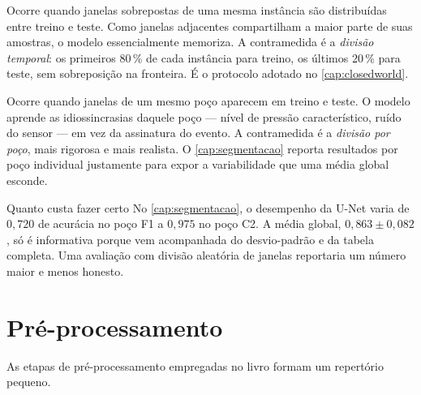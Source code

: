 \begin{description}[leftmargin=0pt,style=nextline,itemsep=0.4em]

\item[Vazamento temporal.] Ocorre quando janelas sobrepostas de uma mesma instância
são distribuídas entre treino e teste. Como janelas adjacentes compartilham a maior
parte de suas amostras, o modelo essencialmente memoriza. A contramedida é a
\emph{divisão temporal}: os primeiros 80\,\% de cada instância para treino, os últimos
20\,\% para teste, sem sobreposição na fronteira. É o protocolo adotado no
\cref{cap:closedworld}.

\item[Vazamento entre poços.] Ocorre quando janelas de um mesmo poço aparecem em treino
e teste. O modelo aprende as idiossincrasias daquele poço --- nível de pressão
característico, ruído do sensor --- em vez da assinatura do evento. A contramedida é a
\emph{divisão por poço}, mais rigorosa e mais realista. O \cref{cap:segmentacao} reporta
resultados por poço individual justamente para expor a variabilidade que uma média
global esconde.

\end{description}

\begin{exemplo}{Quanto custa fazer certo}
No \cref{cap:segmentacao}, o desempenho da U-Net varia de $0{,}720$ de acurácia no poço
F1 a $0{,}975$ no poço C2. A média global, $0{,}863 \pm 0{,}082$, só é informativa
porque vem acompanhada do desvio-padrão e da tabela completa. Uma avaliação com
divisão aleatória de janelas reportaria um número maior e menos honesto.
\end{exemplo}

\section{Pré-processamento}

As etapas de pré-processamento empregadas no livro formam um repertório pequeno.

